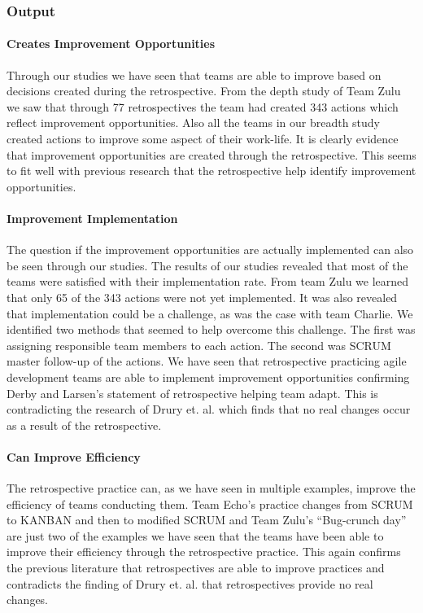 \subsubsection{Output}

\paragraph{Creates Improvement Opportunities}
Through our studies we have seen that teams are able to improve based on decisions created during the retrospective. From the depth study of Team Zulu we saw that through 77 retrospectives the team had created 343 actions which reflect improvement opportunities. Also all the teams in our breadth study created actions to improve some aspect of their work-life. It is clearly evidence that improvement opportunities are created through the retrospective. This seems to fit well with previous research \cite{Larsen2006, Dingsoyr2004, Drury2012} that the retrospective help identify improvement opportunities. 

\paragraph{Improvement Implementation}
The question if the improvement opportunities are actually implemented can also be seen through our studies. The results of our studies revealed that most of the teams were satisfied with their implementation rate. From team Zulu we learned that only 65 of the 343 actions were not yet implemented. It was also revealed that implementation could be a challenge, as was the case with team Charlie. We identified two methods that seemed to help overcome this challenge. The first was assigning responsible team members to each action. The second was SCRUM master follow-up of the actions. We have seen that retrospective practicing agile development teams are able to implement improvement opportunities confirming Derby and Larsen's \cite{Larsen2006} statement of retrospective helping team adapt. This is contradicting the research of Drury et. al. \cite{Drury2012} which finds that no real changes occur as a result of the retrospective. 

\paragraph{Can Improve Efficiency}
The retrospective practice can, as we have seen in multiple examples, improve the efficiency of teams conducting them. Team Echo's practice changes from SCRUM to KANBAN and then to modified SCRUM and Team Zulu's ``Bug-crunch day'' are just two of the examples we have seen that the teams have been able to improve their efficiency through the retrospective practice. This again confirms the previous literature \cite{Dingsoyr2004, Larsen2006, Kinoshita2008} that retrospectives are able to improve practices and contradicts the finding of Drury et. al. \cite{Drury2012} that retrospectives provide no real changes.

